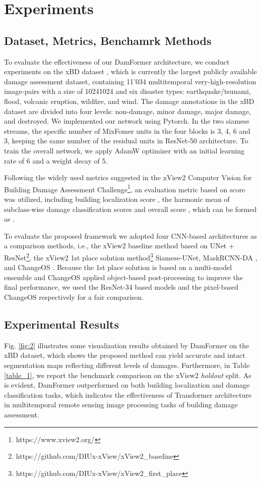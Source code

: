 \documentclass{article}
\begin{document}
\section{Experiments}
\label{sec:experiments}
\subsection{Dataset, Metrics, Benchamrk Methods}\label{sec:general}

\par To evaluate the effectiveness of our DamFormer architecture, we conduct experiments on the xBD dataset \cite{gupta2019xbd}, which is currently the largest publicly available damage assessment dataset, containing 11'034 multitemporal very-high-resolution image-pairs with a size of 10241024 and six disaster types: earthquake/tsunami, flood, volcanic eruption, wildfire, and wind. The damage annotations in the xBD dataset are divided into four levels: non-damage, minor damage, major damage, and destroyed. 
We implemented our network using Pytorch. In the two siamese streams, the specific number of MixFomer units in the four blocks is 3, 4, 6 and 3, keeping the same number of the residual units in ResNet-50 architecture. To train the overall network, we apply AdamW optimizer with an initial learning rate of 6 and a weight decay of 5.
\par Following the widely used metrics suggested in the xView2 Computer Vision for Building Damage Assessment
Challenge\footnote{https://www.xview2.org/}, an evaluation metric based on  score was utilized, including building localization score , the harmonic mean of subclass-wise damage classification scores  and overall score , which can be formed as . 
\par To evaluate the proposed framework we adopted four CNN-based architectures as a comparison methods, i.e., the  xView2 baseline method based on UNet + ResNet\footnote{https://github.com/DIUx-xView/xView2\_baseline}, the xView2 1st place solution method\footnote{https://github.com/DIUx-xView/xView2\_first\_place} Siamese-UNet, MaskRCNN-DA \cite{weber2020building}, and ChangeOS \cite{ZHENG2021112636}. Because the 1st place solution is based on a multi-model ensemble and ChangeOS applied object-based post-processing to improve the final performance, we used the ResNet-34 based models and the pixel-based ChangeOS respectively for a fair comparison.


\subsection{Experimental Results}\label{sec:experi_result}
\par Fig. \ref{fig:2} illustrates some visualization results obtained by DamFormer on the xBD dataset, which shows the proposed method can yield accurate and intact segmentation maps reflecting different levels of damages. Furthermore, in Table \ref{table_1}, we report the benchmark comparison on the xView2 \emph{holdout} split. As is evident, DamFormer outperformed on both building localization and damage classification tasks, which indicates the effectiveness of Transformer architecture in multitemporal remote sensing image processing tasks of building damage assessment. 
\end{document}
